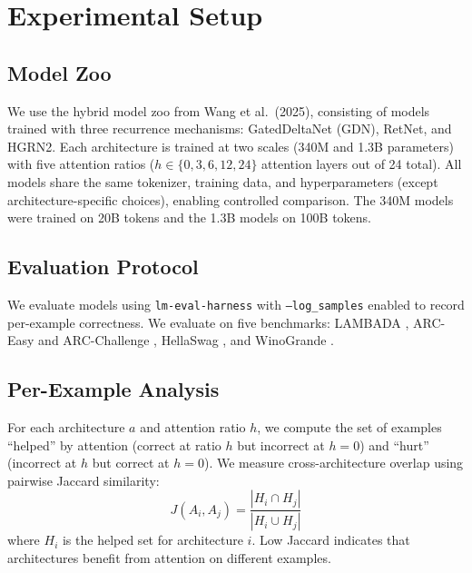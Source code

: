 \documentclass[11pt]{article}
\begin{document}
\section{Experimental Setup}

\subsection{Model Zoo}

We use the hybrid model zoo from Wang et al.\ (2025), consisting of models trained with three recurrence mechanisms: GatedDeltaNet (GDN), RetNet, and HGRN2. Each architecture is trained at two scales (340M and 1.3B parameters) with five attention ratios ($h \in \{0, 3, 6, 12, 24\}$ attention layers out of 24 total). All models share the same tokenizer, training data, and hyperparameters (except architecture-specific choices), enabling controlled comparison. The 340M models were trained on 20B tokens and the 1.3B models on 100B tokens.

\subsection{Evaluation Protocol}

We evaluate models using \texttt{lm-eval-harness} \citep{eval-harness} with \texttt{--log\_samples} enabled to record per-example correctness. We evaluate on five benchmarks: LAMBADA \citep{paperno2016lambada}, ARC-Easy and ARC-Challenge \citep{clark2018think}, HellaSwag \citep{zellers2019hellaswag}, and WinoGrande \citep{sakaguchi2021winogrande}.

\subsection{Per-Example Analysis}

For each architecture $a$ and attention ratio $h$, we compute the set of examples ``helped'' by attention (correct at ratio $h$ but incorrect at $h=0$) and ``hurt'' (incorrect at $h$ but correct at $h=0$). We measure cross-architecture overlap using pairwise Jaccard similarity:
\begin{equation}
    J(A_i, A_j) = \frac{|H_i \cap H_j|}{|H_i \cup H_j|}
\end{equation}
where $H_i$ is the helped set for architecture $i$. Low Jaccard indicates that architectures benefit from attention on different examples.
\end{document}
